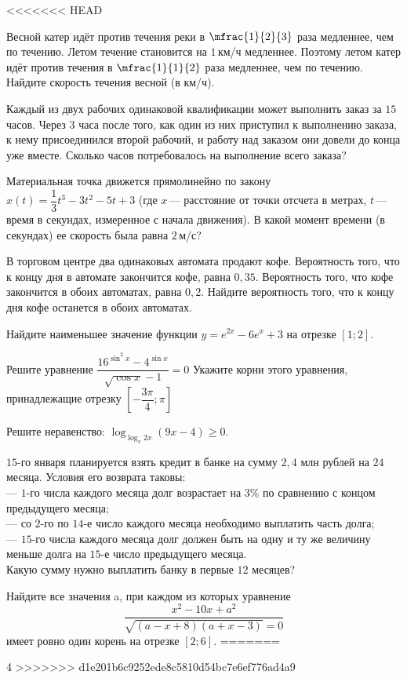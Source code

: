 \begin{class}[number=4]
	\begin{listofex}
<<<<<<< HEAD
		\item Весной катер идёт против течения реки в \(\mfrac{1 }{2 }{ 3}\) раза медленнее, чем по течению. Летом течение становится на \(1\) км/ч медленнее. Поэтому летом катер идёт против течения в \(\mfrac{1 }{1 }{2 }\) раза медленнее, чем по течению. Найдите скорость течения весной (в км/ч).
		\item Каждый из двух рабочих одинаковой квалификации может выполнить заказ за \(15\) часов. Через \(3\) часа после того, как один из них приступил к выполнению заказа, к нему присоединился второй рабочий, и работу над заказом они довели до конца уже вместе. Сколько часов потребовалось на выполнение всего заказа?
		\item Материальная точка движется прямолинейно по закону \(x(t)=\dfrac{ 1 }{ 3 }t^3-3t^2-5t+3\) (где \(x\) --- расстояние от точки отсчета в метрах, \(t\) --- время в секундах, измеренное с начала движения). В какой момент времени (в секундах) ее скорость была равна \(2\) м/с?
		\item В торговом центре два одинаковых автомата продают кофе. Вероятность того, что к концу дня в автомате закончится кофе, равна \(0,35\). Вероятность того, что кофе закончится в обоих автоматах, равна \(0,2\). Найдите вероятность того, что к концу дня кофе останется в обоих автоматах.
		\item Найдите наименьшее значение функции \(y=e^{2x}-6e^x+3\) на отрезке \([1;2]\).
		\item 
		\begin{tasks}
			\task Решите уравнение \( \dfrac{ 16^{\sin^2x}-4^{\sin x} }{ \sqrt{\cos x}-1 }=0 \)
			\task Укажите корни этого уравнения, принадлежащие отрезку \(\left[ -\dfrac{ 3\pi }{ 4 }; \pi \right] \)
		\end{tasks}
		\item Решите неравенство: \(\log_{\log_x 2x}(9x-4) \ge 0 \).
		\item \(15\)-го января планируется взять кредит в банке на сумму \(2,4\) млн рублей на \(24\) месяца. Условия его возврата таковы: \\
		--- \(1\)-го числа каждого месяца долг возрастает на \(3\%\) по сравнению с концом предыдущего месяца; \\
		--- со \(2\)-го по \(14\)-е число каждого месяца необходимо выплатить часть долга; \\
		--- \(15\)-го числа каждого месяца долг должен быть на одну и ту же величину меньше долга на \(15\)-е число предыдущего месяца. \\
		Какую сумму нужно выплатить банку в первые \(12\) месяцев?
		
		\item Найдите все значения a, при каждом из которых уравнение
		\[\dfrac{ x^2-10x+a^2 }{ \sqrt{(a-x+8)(a+x-3)}=0 }\]
		имеет ровно один корень на отрезке \([2; 6]\).
=======
		\item 4
>>>>>>> d1e201b6c9252ede8c5810d54bc7e6ef776ad4a9
	\end{listofex}
\end{class}

